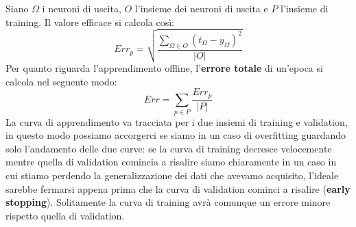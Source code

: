 \documentclass[12pt, twoside, letterpaper]{report}
\begin{document}
				Siano $\Omega$ i neuroni di uscita, $O$ l'insieme dei neuroni di uscita e $P$ l'insieme di training. Il valore efficace si calcola così: $$Err_p = \sqrt{\frac{\sum_{\Omega \in O} (t_{\Omega} - y_{\Omega})^2}{|O|}}$$
				Per quanto riguarda l'apprendimento offline, l'\textbf{errore totale} di un'epoca si calcola nel seguente modo: $$Err = \sum_{p \in P} \frac{Err_p}{|P|}$$ 
				La curva di apprendimento va tracciata per i due insiemi di training e validation, in questo modo possiamo accorgerci se siamo in un caso di overfitting guardando solo l'andamento delle due curve: se la curva di training decresce velocemente mentre quella di validation comincia a risalire siamo chiaramente in un caso in cui stiamo perdendo la generalizzazione dei dati che avevamo acquisito, l'ideale sarebbe fermarsi appena prima che la curva di validation cominci a risalire (\textbf{early stopping}). Solitamente la curva di training avrà comunque un errore minore rispetto quella di validation.
\end{document}
